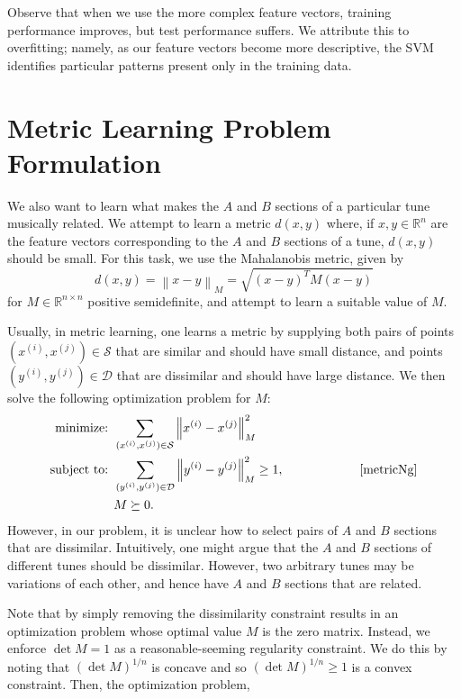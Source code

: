 \documentclass{article} %
\newcommand{\xip}{x^{(i)}}
\newcommand{\xjp}{x^{(j)}}
\newcommand{\yip}{y^{(i)}}
\newcommand{\yjp}{y^{(j)}}
\newcommand{\vectornorm}[1]{\left\| #1 \right\|}
\begin{document}
Observe that when we use the more complex feature vectors, training performance
improves, but test performance suffers. We attribute this to overfitting;
namely, as our feature vectors become more descriptive, the SVM identifies
particular patterns present only in the training data.

\section{Metric Learning Problem Formulation}
We also want to learn what makes the $A$ and $B$ sections of a particular tune
musically related. We attempt to learn a metric $d(x, y)$ where, if $x, y \in
\mathbb{R}^n$ are the feature vectors corresponding to the $A$ and $B$ sections
of a tune, $d(x, y)$ should be small. For this task, we use the Mahalanobis
metric, given by
\[
d(x,y) = \vectornorm{x-y}_M = \sqrt{(x-y)^T M (x-y)}
\] 
for $M \in \mathbb{R}^{n\times n}$ positive semidefinite, and attempt to learn a
suitable value of $M$.

Usually, in metric learning, one learns a metric by supplying both pairs of
points $(\xip, \xjp) \in \mathcal{S}$ that are similar and should have small
distance, and points $(\yip, \yjp) \in \mathcal{D}$ that are dissimilar and
should have large distance. We then solve the following optimization problem for
$M$: %
\begin{align*} 
\text{minimize: } &
\sum_{(x^{(i)}, x^{(j)}) \in \mathcal S} \vectornorm{x^{(i)} - x^{(j)}}_M^2 \\
\text{subject to: }
& \sum_{(y^{(i)}, y^{(j)}) \in \mathcal D}
	\vectornorm{y^{(i)} - y^{(j)}}_M^2 \ge 1,
\quad\quad\quad\quad\quad\quad \cite{metricNg} \\
& M \succeq 0.
\end{align*} 
However, in our problem, it is unclear how to select pairs of $A$ and $B$
sections that are dissimilar. Intuitively, one might argue that the $A$ and $B$
sections of different tunes should be dissimilar. However, two arbitrary tunes
may be variations of each other, and hence have $A$ and $B$ sections that are
related.

Note that by simply removing the dissimilarity constraint results in an
optimization problem whose optimal value $M$ is the zero matrix. Instead, we
enforce $\det M = 1$ as a reasonable-seeming regularity constraint. We do this
by noting that $(\det M)^{1/n}$ is concave and so $(\det M)^{1/n} \ge 1$ is a
convex constraint. Then, the optimization problem,
\end{document}
